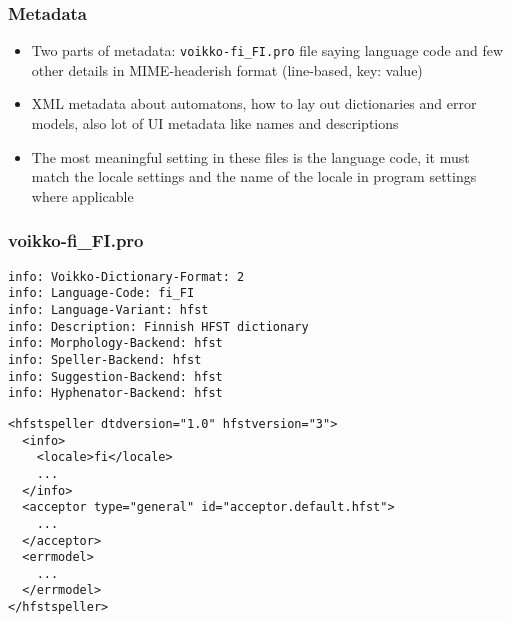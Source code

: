\documentclass[t,12pt]{beamer}
\begin{document}
\begin{frame}
    \frametitle{Metadata}
    \begin{itemize}
        \item Two parts of metadata: \texttt{voikko-fi\_FI.pro} file saying
            language code and few other details in MIME-headerish format
            (line-based, key: value)
        \item XML metadata about automatons, how to lay out dictionaries and
            error models, also lot of UI metadata like names and descriptions
        \item The most meaningful setting in these files is the language code,
            it must match the locale settings and the name of the locale
            in program settings where applicable
    \end{itemize}
\end{frame}

\begin{frame}[fragile]
    \frametitle{voikko-fi\_FI.pro}
    \begin{verbatim}
info: Voikko-Dictionary-Format: 2
info: Language-Code: fi_FI
info: Language-Variant: hfst
info: Description: Finnish HFST dictionary
info: Morphology-Backend: hfst
info: Speller-Backend: hfst
info: Suggestion-Backend: hfst
info: Hyphenator-Backend: hfst
    \end{verbatim}
\end{frame}

\begin{frame}[fragile]
    \begin{verbatim}
<hfstspeller dtdversion="1.0" hfstversion="3">
  <info>
    <locale>fi</locale>
    ...
  </info>
  <acceptor type="general" id="acceptor.default.hfst">
    ...
  </acceptor>
  <errmodel>
    ...
  </errmodel>
</hfstspeller>
\end{verbatim}
\end{frame}
\end{document}
